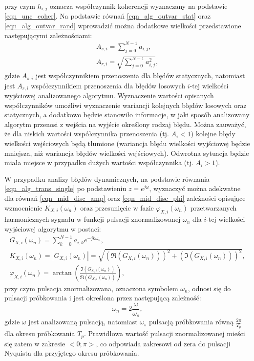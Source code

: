 przy czym $h_{i,j}$ oznacza współczynnik koherencji wyznaczany na podstawie \eqref{eqn_unc_coher}. Na podstawie równań \eqref{eqn_alg_outvar_stat} oraz \eqref{eqn_alg_outvar_rand} wprowadzić można dodatkowe wielkości przedstawione następującymi zależnościami:
\begin{gather}
A_{s,i} = \sum _{j = 0} ^{N-1} a_{i, j} \label{eqn_alg_trans_stat}, \\
A_{r,i} = \sqrt{\sum _{j = 0} ^{N-1} a_{i, j}^{2}} \label{eqn_alg_trans_rand}, 
\end{gather}
gdzie $A_{s,i}$ jest współczynnikiem przenoszenia dla błędów statycznych, natomiast jest $A_{r,i}$ współczynnikiem przenoszenia dla błędów losowych $i$-tej wielkości wyjściowej analizowanego algorytmu. Wyznaczenie wartości opisanych współczynników umożliwi wyznaczenie wariancji kolejnych błędów losowych oraz statycznych, a dodatkowo będzie stanowiło informacje, w jaki sposób analizowany algorytm przenosi z wejścia na wyjście określony rodzaj błędu. Można zauważyć, że dla niskich wartości współczynnika przenoszenia (tj. $A_{i} < 1$) kolejne błędy wielkości wejściowych będą tłumione (wariancja błędu wielkości wyjściowej będzie mniejsza, niż wariancja błędów wielkości wejściowych). Odwrotna sytuacja będzie miała miejsce w przypadku dużych wartości współczynnika (tj. $A_{i} > 1$).

W przypadku analizy błędów dynamicznych, na podstawie równania \eqref{eqn_alg_trans_single} po podstawieniu $z = e^{j\omega}$, wyznaczyć można adekwatne dla równań \eqref{eqn_mid_disc_amp} oraz \eqref{eqn_mid_disc_phi} zależności opisujące wzmocnienie $K_{X,i}(\omega_{n})$ oraz przesunięcie w fazie $\varphi_{X,i}(\omega_{n})$ przetwarzanych harmonicznych sygnału w funkcji pulsacji znormalizowanej $\omega_{n}$ dla $i$-tej wielkości wyjściowej algorytmu w postaci:
\begin{gather}
G_{X,i}(\omega_{n}) = \sum _{k = 0} ^{N-1} a_{i,k} e^{-j k \omega_{n}} \label{eqn_alg_trans_norm}, \\
K_{X,i}(\omega_{n}) = \left| G_{X,i}(\omega_{n}) \right| = \sqrt{\left( \Re \left( G_{X,i}(\omega_{n}) \right) \right)^2 + \left( \Im \left( G_{X,i}(\omega_{n}) \right) \right)^2} \label{eqn_alg_trans_amp}, \\
\varphi_{X,i}(\omega_{n}) = \arctan \left( \frac{\Im (G_{X,i}(\omega_{n}))}{\Re (G_{X,i}(\omega_{n}))} \right) \label{eqn_alg_trans_phi},
\end{gather}
przy czym pulsacja znormalizowana, oznaczona symbolem $\omega_{n}$, odnosi się do pulsacji próbkowania i jest określona przez następującą zależność:
\begin{equation}
\omega_{n} = 2 \frac{\omega}{\omega_{s}} \label{eqn_puls_norm},
\end{equation}
gdzie $\omega$ jest analizowaną pulsacją, natomiast $\omega_{s}$ pulsacją próbkowania równą $\frac{2 \pi}{T_{p}}$ dla okresu próbkowania $T_{p}$. Prawidłowa wartość pulsacji znormalizowanej mieści się zatem w zakresie $<0;\pi>$, co odpowiada zakresowi od zera do pulsacji Nyquista dla przyjętego okresu próbkowania.

